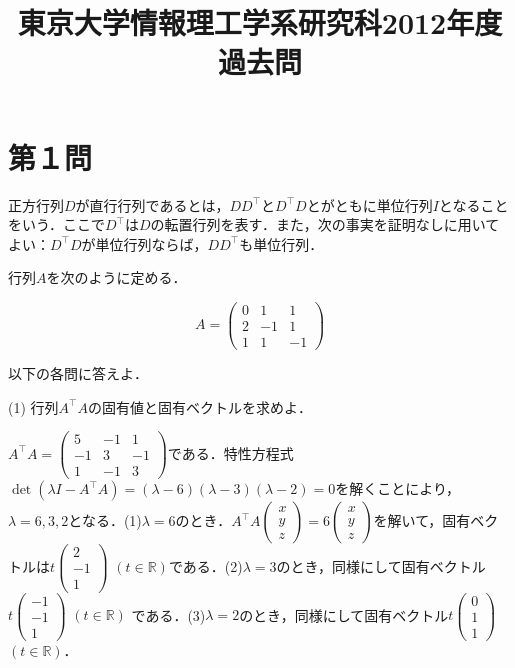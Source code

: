 \documentclass[a4j]{jarticle}
\title{東京大学情報理工学系研究科2012年度過去問}
\author{}
\date{}
\begin{document}
\thispagestyle{empty}
\maketitle
\pagebreak

\section{第１問}

\begin{screen}
正方行列$D$が直行行列であるとは，$DD^\top$と$D^\top D$とがともに単位行列$I$となることをいう．ここで$D^\top$は$D$の転置行列を表す．また，次の事実を証明なしに用いてよい：$D^\top D$が単位行列ならば，$DD^\top$も単位行列．

行列$A$を次のように定める．

$$A=
\begin{pmatrix}
0 & 1 & 1 \\
2 & -1 & 1 \\
1 & 1 & -1
\end{pmatrix}$$

以下の各問に答えよ．
\end{screen}

\begin{screen}
(1)
行列$A^\top A$の固有値と固有ベクトルを求めよ．
\end{screen}
$A^\top A=
\begin{pmatrix}
5& -1&  1\\
-1&  3& -1\\
 1& -1&  3
\end{pmatrix}$$
$である．特性方程式$\det(\lambda I -A^\top A)=(\lambda-6)(\lambda-3)(\lambda-2)=0$を解くことにより，$\lambda = 6,3,2$となる．(1)$\lambda=6$のとき．$A^\top A\left(\begin{array}{c} x \\ y \\ z \end{array} \right) = 6\left(\begin{array}{c} x \\ y \\ z \end{array} \right)$を解いて，固有ベクトルは$t\left(\begin{array}{c} 2 \\ -1 \\ 1 \end{array} \right)$ $(t\in \mathbb{R})$である．(2)$\lambda=3$のとき，同様にして固有ベクトル$t\left(\begin{array}{c} -1 \\ -1 \\ 1 \end{array} \right)$ $(t\in \mathbb{R})$ である．(3)$\lambda=2$のとき，同様にして固有ベクトル$t\left(\begin{array}{c} 0\\ 1 \\ 1 \end{array} \right)$ $(t\in \mathbb{R})$．
\end{document}
